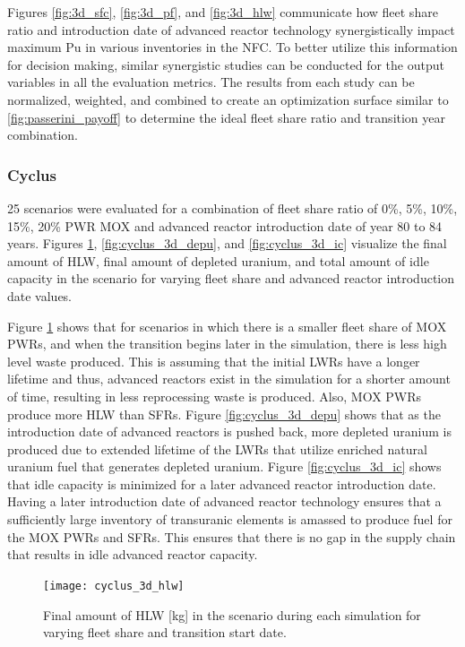 Figures \ref{fig:3d_sfc}, \ref{fig:3d_pf}, and \ref{fig:3d_hlw}
communicate how fleet share ratio and introduction date of advanced 
reactor technology 
synergistically impact maximum Pu in various inventories in the 
\gls{NFC}. 
To better utilize this information for decision making, 
similar synergistic studies can be conducted for the output 
variables in all the evaluation metrics. 
The results from each study can be normalized, weighted, and 
combined to create an optimization surface similar 
to \ref{fig:passerini_payoff} to determine the ideal fleet share 
ratio and transition year combination. 

\subsubsection{\textbf{Cyclus}}
25 scenarios were evaluated for a combination of fleet share ratio 
of 0\%, 5\%, 10\%, 15\%, 20\% PWR MOX and advanced reactor introduction 
date of year 80 to 84 years.
Figures \ref{fig:cyclus_3d_hlw}, \ref{fig:cyclus_3d_depu}, and 
\ref{fig:cyclus_3d_ic}
visualize the final amount of HLW, final amount of depleted uranium, and
total amount of idle capacity in the scenario for varying 
fleet share and advanced reactor introduction date values. 

Figure \ref{fig:cyclus_3d_hlw} shows that for scenarios in which 
there is a smaller fleet share of \gls{MOX} \glspl{PWR}, and when the 
transition begins 
later in the simulation, there is less high level waste produced. 
This is assuming that the initial \glspl{LWR} have a longer lifetime
and thus, advanced reactors exist in the simulation for a shorter 
amount of time, resulting in less reprocessing waste is produced. 
Also, \gls{MOX} \glspl{PWR} produce more \gls{HLW} than \glspl{SFR}. 
Figure \ref{fig:cyclus_3d_depu} shows that as the introduction date 
of advanced reactors is pushed back, more depleted uranium is produced 
due to extended lifetime of the \glspl{LWR} that utilize enriched 
natural uranium fuel that generates depleted uranium. 
Figure \ref{fig:cyclus_3d_ic} shows that idle capacity is minimized 
for a later advanced reactor introduction date. 
Having a later introduction date of advanced reactor technology ensures 
that a sufficiently large inventory of transuranic elements is amassed
to produce fuel for the \gls{MOX} \glspl{PWR} and \glspl{SFR}.  
This ensures that there is no gap in the supply chain that results 
in idle advanced reactor capacity.

\begin{figure}[]
    \centering
    \texttt{[image: cyclus\_3d\_hlw]} 
    \caption{Final amount of HLW [kg] in the scenario during each simulation for varying fleet share and transition start date.}
    \label{fig:cyclus_3d_hlw}
\end{figure}

